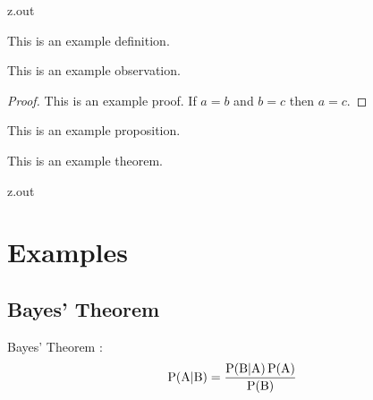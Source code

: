 \begin{VerbatimOut}{z.out}

\index{\verb+\begin{definition}+}
\begin{definition}
  This is an example definition.
\end{definition}

\index{\verb+\begin{observation}+}
\begin{observation}
  This is an example observation.
\end{observation}

\index{\verb+\begin{proof}+}
\begin{proof}
  This is an example proof.
  If \(a = b\) and \(b = c\) then \(a = c\).
\end{proof}

\index{\verb+\begin{proposition}+}
\begin{proposition}
  This is an example proposition.
\end{proposition}

\index{\verb+\begin{theorem}+}
\begin{theorem}
  This is an example theorem.
\end{theorem}
\end{VerbatimOut}

\MyIO


\begin{VerbatimOut}{z.out}


\section{Examples}

\subsection{Bayes' Theorem}

Bayes' Theorem \cite{bayes}:
{
  \UndefineShortVerb{\|}
\[
  \text{P}(\text A|\text B)
    = \frac{\text P(\text B|\text A)\,\text P(\text A)}{\text P(\text B)}
\]
}
\end{VerbatimOut}

